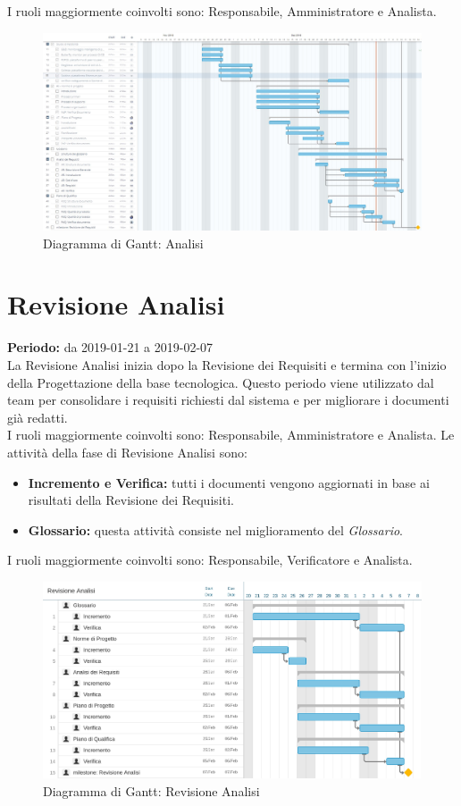 I ruoli maggiormente coinvolti sono: Responsabile, Amministratore e Analista.
\begin{figure} [h]
    \centering
    \includegraphics[scale=0.3]{./images/analisi.jpg}
    \caption{Diagramma di Gantt: Analisi }\label{}
\end{figure}
\section{Revisione Analisi}
\textbf{Periodo:} da 2019-01-21 a 2019-02-07\\
La Revisione Analisi inizia dopo la Revisione dei Requisiti e termina con l’inizio della Progettazione della base tecnologica. Questo periodo viene utilizzato dal team per consolidare i requisiti richiesti dal sistema e per migliorare i documenti già redatti.\\I ruoli maggiormente coinvolti sono: Responsabile, Amministratore e Analista.
Le attività della fase di Revisione Analisi sono:
\begin{itemize}
    \item \textbf{Incremento e Verifica:} tutti i documenti vengono aggiornati in base ai risultati della Revisione dei Requisiti.
    \item \textbf{Glossario:} questa attività consiste nel miglioramento del \textit{Glossario}.
\end{itemize}
I ruoli maggiormente coinvolti sono: Responsabile, Verificatore e Analista.
\begin{figure} [h]
    \centering
    \includegraphics[scale=0.1]{./images/revisione_analisi.jpg}
    \caption{Diagramma di Gantt: Revisione Analisi }\label{}
\end{figure}
